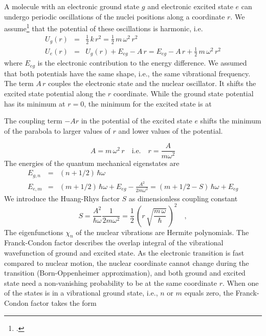 A molecule with an electronic ground state $g$ and electronic excited state $e$ can undergo periodic oscillations of the nuclei positions along a coordinate $r$. We assume\footcite{Kuzmany} that the potential of these oscillations is harmonic, i.e.
\begin{eqnarray}
 U_g(r) &=& \frac{1}{2} \, k\, r^2 = \frac{1}{2} \, m \, \omega^2 \, r^2 \\
  U_e(r) &=&  U_g(r) + E_{eg} - A \, r = E_{eg}  - A \, r + \frac{1}{2} \, m \, \omega^2 \, r^2 
 \end{eqnarray}
where $E_{eg}$ is the electronic contribution to the energy difference. We assumed that both potentials have the same shape, i.e., the same vibrational frequency. The term $A \, r$ couples the electronic state and the nuclear oscillator. It shifts the excited state potential along the $r$ coordinate. While the ground state potential has its minimum at $r=0$, the minimum for the excited state is at
%
%
\begin{marginfigure}
   
\caption{The coupling term $-A r$ in the potential of the excited state $e$ shifts the minimum of the parabola to larger values of $r$ and lower values of the potential. }
\end{marginfigure}
%
%
\begin{equation}
 A = m \, \omega^2 \,  r	 \quad \text{i.e.} \quad r = \frac{A}{m \omega^2}
\end{equation}
The energies of the quantum mechanical eigenstates are 
\begin{eqnarray}
  E_{g, n} &=&  (n + 1/2) \, \hbar \omega  \\
  E_{e, m} &=&  (m + 1/2) \, \hbar \omega  +  E_{eg} - \frac{A^2}{2 m \omega^2} =
   (m + 1/2 - S) \, \hbar \omega  +  E_{eg}  \nonumber
\end{eqnarray}
We introduce the Huang-Rhys factor $S$ as dimensionless coupling constant
\begin{equation}
 S = \frac{A^2}{\hbar \omega} \frac{1}{2 m \omega^2}
 = \frac{1}{2} \, \left( r \, \sqrt{\frac{m \, \omega}{\hbar}}\, \right)^2 \quad ,
\end{equation}
The eigenfunctions $\chi_n$ of the nuclear vibrations are Hermite polynomials. The Franck-Condon factor describes the overlap integral of the vibrational wavefunction of ground and excited state. As the electronic transition is fast compared to nuclear motion, the nuclear coordinate cannot change during the transition (Born-Oppenheimer approximation), and both ground and excited state need a non-vanishing probability to be at the same coordinate $r$. When one of the states is in a vibrational ground state, i.e., $n$ or $m$ equals zero, the Franck-Condon factor takes the form
